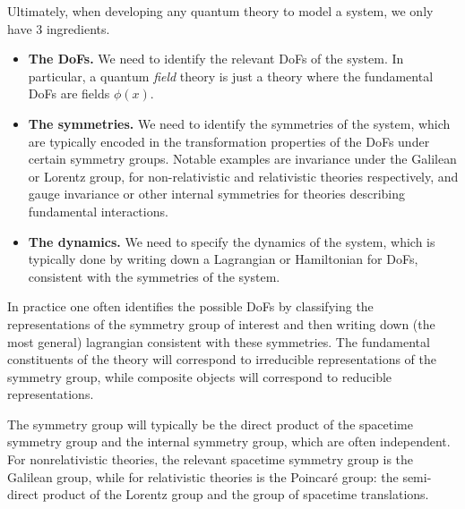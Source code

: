\documentclass[../QFT_main.tex]{subfiles}
\begin{document}
\begin{mytheorem}
Ultimately, when developing any quantum theory to model a system, we only have 3 ingredients.
\begin{itemize}
    \item \textbf{The DoFs.} We need to identify the relevant DoFs of the system.
    In particular, a quantum \emph{field} theory is just a theory where the fundamental DoFs are fields $\phi(x)$.
    \item \textbf{The symmetries.} We need to identify the symmetries of the system, which are typically encoded in the transformation properties of the DoFs under certain symmetry groups.
    Notable examples are invariance under the Galilean or Lorentz group, for non-relativistic and relativistic theories respectively, and gauge invariance or other internal symmetries for theories describing fundamental interactions.
    \item \textbf{The dynamics.} We need to specify the dynamics of the system, which is typically done by writing down a Lagrangian or Hamiltonian for DoFs, consistent with the symmetries of the system.
\end{itemize}
In practice one often identifies the possible DoFs by classifying the representations of the symmetry group of interest and then writing down (the most general) lagrangian consistent with these symmetries.
The fundamental constituents of the theory will correspond to irreducible representations of the symmetry group, while composite objects will correspond to reducible representations.

The symmetry group will typically be the direct product of the spacetime symmetry group and the internal symmetry group, which are often independent.
For nonrelativistic theories, the relevant spacetime symmetry group is the Galilean group, while for relativistic theories is the Poincaré group: the semi-direct product of the Lorentz group and the group of spacetime translations.
\end{mytheorem}
\end{document}

